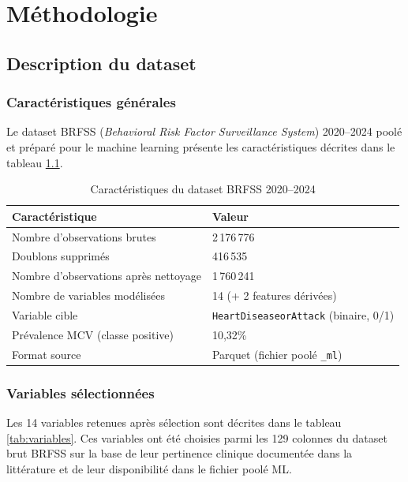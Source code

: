 \chapter{Méthodologie}
\label{chap:methodologie}

\section{Description du dataset}

\subsection{Caractéristiques générales}

Le dataset BRFSS (\textit{Behavioral Risk Factor Surveillance System}) 2020--2024 poolé et préparé pour le machine learning présente les caractéristiques décrites dans le tableau \ref{tab:dataset_chars}.

\begin{table}[H]
\centering
\caption{Caractéristiques du dataset BRFSS 2020--2024}
\label{tab:dataset_chars}
\begin{tabular}{ll}
\toprule
\textbf{Caractéristique} & \textbf{Valeur} \\
\midrule
Nombre d'observations brutes & 2\,176\,776 \\
Doublons supprimés & 416\,535 \\
Nombre d'observations après nettoyage & 1\,760\,241 \\
Nombre de variables modélisées & 14 (+ 2 features dérivées) \\
Variable cible & \texttt{HeartDiseaseorAttack} (binaire, 0/1) \\
Prévalence MCV (classe positive) & 10,32\% \\
Format source & Parquet (fichier poolé \texttt{\_ml}) \\
\bottomrule
\end{tabular}
\end{table}

\subsection{Variables sélectionnées}

Les 14 variables retenues après sélection sont décrites dans le tableau \ref{tab:variables}. Ces variables ont été choisies parmi les 129 colonnes du dataset brut BRFSS sur la base de leur pertinence clinique documentée dans la littérature et de leur disponibilité dans le fichier poolé ML.

